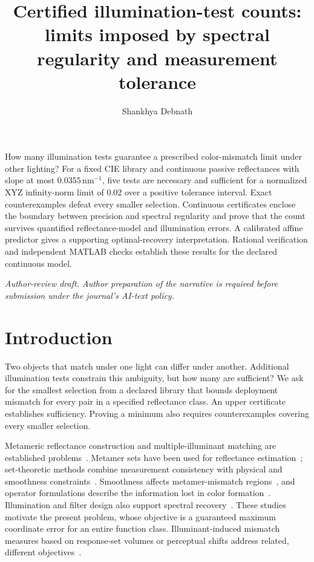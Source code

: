 \documentclass{optica-article}
\begin{document}
\title{Certified illumination-test counts: limits imposed by spectral regularity and measurement tolerance}
\author{Shankhya Debnath}
\address{Department of Printing Technology, Regional Institute of Printing Technology, Kolkata, India}
\begin{abstract*}
How many illumination tests guarantee a prescribed color-mismatch limit under other lighting? For a fixed CIE library and continuous passive reflectances with slope at most $0.0355\,\mathrm{nm}^{-1}$, five tests are necessary and sufficient for a normalized XYZ infinity-norm limit of 0.02 over a positive tolerance interval. Exact counterexamples defeat every smaller selection. Continuous certificates enclose the boundary between precision and spectral regularity and prove that the count survives quantified reflectance-model and illumination errors. A calibrated affine predictor gives a supporting optimal-recovery interpretation. Rational verification and independent MATLAB checks establish these results for the declared continuous model.
\end{abstract*}
\noindent\textit{Author-review draft. Author preparation of the narrative is required before submission under the journal's AI-text policy.}

\section{Introduction}
Two objects that match under one light can differ under another. Additional illumination tests constrain this ambiguity, but how many are sufficient? We ask for the smallest selection from a declared library that bounds deployment mismatch for every pair in a specified reflectance class. An upper certificate establishes sufficiency. Proving a minimum also requires counterexamples covering every smaller selection.

Metameric reflectance construction and multiple-illuminant matching are established problems~\cite{worthey,burns}. Metamer sets have been used for reflectance estimation~\cite{morovic2006}; set-theoretic methods combine measurement consistency with physical and smoothness constraints~\cite{sharma}. Smoothness affects metamer-mismatch regions~\cite{stiebel}, and operator formulations describe the information lost in color formation~\cite{morovic2026a,morovic2026b}. Illumination and filter design also support spectral recovery~\cite{park,fu,niu}. These studies motivate the present problem, whose objective is a guaranteed maximum coordinate error for an entire function class. Illuminant-induced mismatch measures based on response-set volumes or perceptual shifts address related, different objectives~\cite{esposito}.
\end{document}
